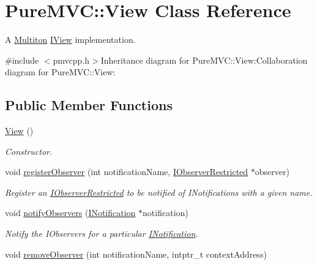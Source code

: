 \hypertarget{class_pure_m_v_c_1_1_view}{
\section{PureMVC::View Class Reference}
\label{class_pure_m_v_c_1_1_view}
}


A \hyperlink{class_pure_m_v_c_1_1_multiton}{Multiton} {\ttfamily \hyperlink{class_pure_m_v_c_1_1_i_view}{IView}} implementation.  


{\ttfamily \#include $<$pmvcpp.h$>$}Inheritance diagram for PureMVC::View:Collaboration diagram for PureMVC::View:\subsection*{Public Member Functions}
\begin{DoxyCompactItemize}
\item 
\hyperlink{class_pure_m_v_c_1_1_view_a44ad60a768422d3fa8fbd7576950080a}{View} ()
\begin{DoxyCompactList}\small\item\em Constructor. \item\end{DoxyCompactList}\item 
void \hyperlink{class_pure_m_v_c_1_1_view_a42ebef42cf8d7dc72d05e4c11e75cd66}{registerObserver} (int notificationName, \hyperlink{class_pure_m_v_c_1_1_i_observer_restricted}{IObserverRestricted} $\ast$observer)
\begin{DoxyCompactList}\small\item\em Register an {\ttfamily \hyperlink{class_pure_m_v_c_1_1_i_observer_restricted}{IObserverRestricted}} to be notified of {\ttfamily INotifications} with a given name. \item\end{DoxyCompactList}\item 
void \hyperlink{class_pure_m_v_c_1_1_view_a515953a4f2e9c6b7a29ae0591657b9f3}{notifyObservers} (\hyperlink{class_pure_m_v_c_1_1_i_notification}{INotification} $\ast$notification)
\begin{DoxyCompactList}\small\item\em Notify the {\ttfamily IObservers} for a particular {\ttfamily \hyperlink{class_pure_m_v_c_1_1_i_notification}{INotification}}. \item\end{DoxyCompactList}\item 
void \hyperlink{class_pure_m_v_c_1_1_view_a950c0a587a04909a8301f236f8501de2}{removeObserver} (int notificationName, intptr\_\-t contextAddress)

\end{DoxyCompactItemize}
